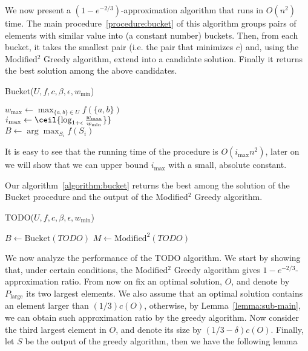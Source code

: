 \def\pLarge{P_{\text{large}}}
\def\pValuable{P_{\text{valuable}}}

We now present a $(1-e^{-2/3})$-approximation algorithm that runs in $O(n^2)$ time.
The main procedure~\ref{procedure:bucket} of this algorithm  groups pairs of elements with similar value into (a constant number) buckets.
Then, from each bucket, it takes the smallest pair (i.e. the pair that minimizes $c$) and, using the Modified$^2$ Greedy algorithm, extend into a candidate solution.
Finally it returns the best solution among the above candidates.

\begin{procedure}
	\caption{Bucket($U, f, c, \beta, \epsilon, w_{\min}$)}
	\label{procedure:bucket}
	$w_{\max} \leftarrow \max_{\{a, b\} \in U}f(\{a, b\})$
	\\
	$i_{\max} \leftarrow \ceil{\log_{1 + \epsilon}\frac{w_{\max}}{w_{\min}}\}}$
	\\
	$B \leftarrow \arg\max_{S_i}f(S_i)$
	\\
\end{procedure}

It is easy to see that the running time of the procedure is $O(i_{\max}n^2)$,
later on we will show that we can upper bound $i_{\max}$ with a small, absolute constant.

Our algorithm~\ref{algorithm:bucket} returns the best among the solution of the Bucket procedure and the output of the Modified$^2$ Greedy algorithm.

\begin{algorithm}
	\label{algorithm:bucket}
	\caption{TODO($U, f, c, \beta, \epsilon, w_{\min}$)}
	$B \leftarrow \text{Bucket}(TODO)$
	$M \leftarrow \text{Modified}^2(TODO)$
	\Return \argmax
\end{algorithm}

We now analyze the performance of the TODO algorithm.
We start by showing that,  under certain conditions, the Modified$^2$ Greedy algorithm gives $1 - e^{-2/3}$-approximation ratio.
From now on fix an optimal solution, $O$, and denote by $\pLarge$ its two largest elements.
We also assume that an optimal solution contains an element larger than $(1/3)c(O)$, otherwise, by Lemma~\ref{lemma:sub-main}, we can obtain such approximation ratio by the greedy algorithm.
Now consider the third largest element in $O$, and denote its size by $(1/3 - \delta)c(O)$.
Finally, let $S$ be the output of the greedy algorithm, then we have the following lemma

